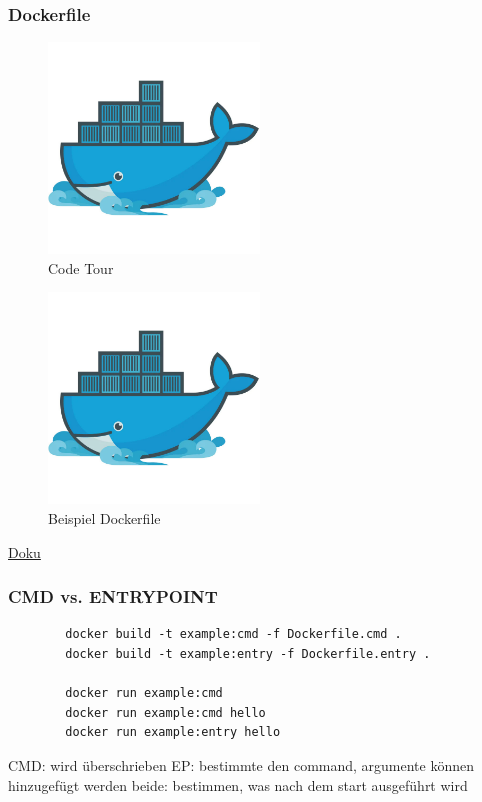 \documentclass[22pt,handout]{beamer}
\begin{document}
\begin{frame}[fragile]
    \frametitle{Dockerfile}
    
    \begin{figure}[h]
        \centering
        \includegraphics[width=0.5\textwidth]{Bilder/mobydocker.jpg}
        \caption{Code Tour}
    \end{figure}
    \begin{figure}[h]
        \centering
        \includegraphics[width=0.5\textwidth]{Bilder/mobydocker.jpg}
        \caption{Beispiel Dockerfile}
    \end{figure}
    \href{https://docs.docker.com/reference/dockerfile/#overview}{Doku}
\end{frame}

\begin{frame}[fragile]
    \frametitle{CMD vs. ENTRYPOINT}
    \begin{verbatim}
        docker build -t example:cmd -f Dockerfile.cmd .
        docker build -t example:entry -f Dockerfile.entry .

        docker run example:cmd
        docker run example:cmd hello
        docker run example:entry hello
    \end{verbatim}
    CMD: wird überschrieben
    EP: bestimmte den command, argumente können hinzugefügt werden
    beide: bestimmen, was nach dem start ausgeführt wird
\end{frame}
\end{document}
